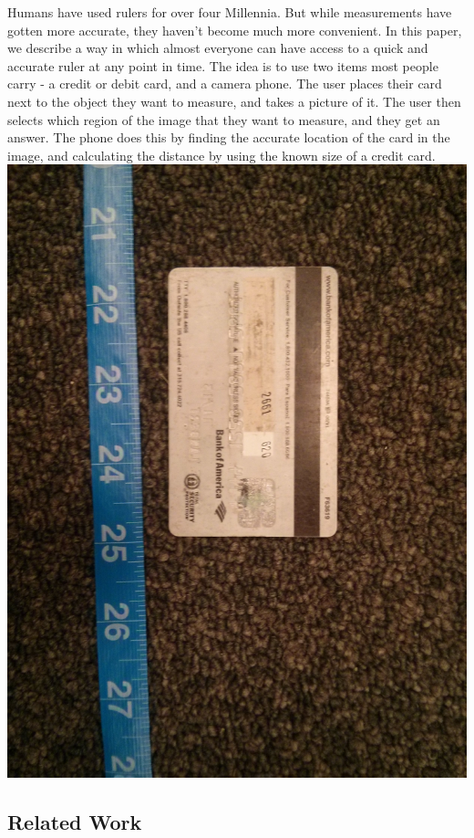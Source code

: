 \documentclass[10pt,twocolumn,letterpaper]{article}
\begin{document}
Humans have used rulers for over four Millennia. But while measurements have gotten more accurate, they haven’t become much more convenient. In this paper, we describe a way in which almost everyone can have access to a quick and accurate ruler at any point in time. The idea is to use two items most people carry - a credit or debit card, and a camera phone. The user places their card next to the object they want to measure, and takes a picture of it. The user then selects which region of the image that they want to measure, and they get an answer. The phone does this by finding the accurate location of the card in the image, and calculating the distance by using the known size of a credit card.
\includegraphics[scale=.01]{one}

\subsection{Related Work}
\end{document}
